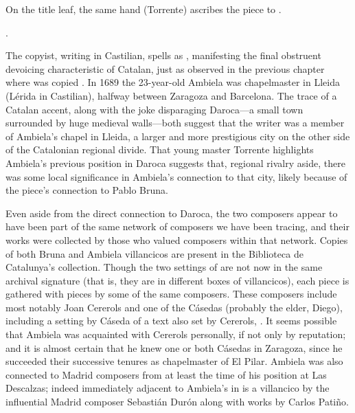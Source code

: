 On the title leaf, the same hand (Torrente) ascribes the piece to
.%
\begin{Footnote}
    .
\end{Footnote}
The copyist, writing in Castilian, spells  as ,
manifesting the final obstruent devoicing characteristic of Catalan, just as
observed in the previous chapter where  was copied
.  
In 1689 the 23-year-old Ambiela was chapelmaster in Lleida (Lérida in
Castilian), halfway between Zaragoza and Barcelona.
The trace of a Catalan accent, along with the joke disparaging Daroca---a small
town surrounded by huge medieval walls---both suggest that the writer was a
member of Ambiela's chapel in Lleida, a larger and more prestigious city on the
other side of the Catalonian regional divide.
That young master Torrente highlights Ambiela's previous position in Daroca
suggests that, regional rivalry aside, there was some local significance in
Ambiela's connection to that city, likely because of the piece's connection to
Pablo Bruna.

Even aside from the direct connection to Daroca, the two composers appear to
have been part of the same network of composers we have been tracing, and their
works were collected by those who valued composers within that network.  
Copies of both Bruna and Ambiela villancicos are present in the Biblioteca de
Catalunya's collection.
Though the two settings of  are not now in the same
archival signature (that is, they are in different boxes of villancicos), each
piece is gathered with pieces by some of the same composers.  
These composers include most notably Joan Cererols and one of the Cásedas
(probably the elder, Diego), including a setting by Cáseda of a text also set
by Cererols, . %
It seems possible that Ambiela was acquainted with Cererols personally, if not
only by reputation; and it is almost certain that he knew one or both Cásedas
in Zaragoza, since he succeeded their successive tenures as chapelmaster of El
Pilar.
Ambiela was also connected to Madrid composers from at least the time of
his position at Las Descalzas; indeed immediately adjacent to Ambiela's
 in  is a villancico by the
influential Madrid composer Sebastián Durón along with works by Carlos Patiño.

